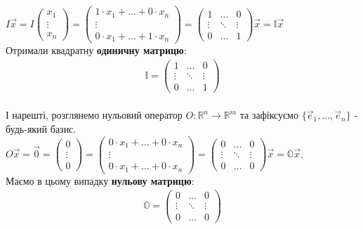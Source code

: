 \documentclass[a4paper, 10pt]{article}
\theoremstyle{theoremdd}
\begin{document}
	$I \vec{x} = I \begin{pmatrix}
	x_1 \\ \vdots \\ x_n
	\end{pmatrix} = \begin{pmatrix}
	1 \cdot x_1 + \dots + 0 \cdot x_n \\ \vdots \\ 0 \cdot x_1 + \dots + 1 \cdot x_n
	\end{pmatrix} = \begin{pmatrix}
	1 & \dots & 0 \\
	\vdots & \ddots & \vdots \\
	0 & \dots & 1
	\end{pmatrix} \vec{x} = \mathbb{I} \vec{x}$
	\\
	Отримали квадратну \textbf{одиничну матрицю}:
	\begin{align*}
	\mathbb{I} = \begin{pmatrix}
	1 & \dots & 0 \\
	\vdots & \ddots & \vdots \\
	0 & \dots & 1
	\end{pmatrix}
	\end{align*}
	\bigskip \\
	І нарешті, розглянемо нульовий оператор $O \colon \mathbb{R}^n \to \mathbb{R}^m$ та зафіксуємо $\{\vec{e}_1, \dots, \vec{e}_n\}$ - будь-який базис.\\
	$O \vec{x} = \vec{0} = \begin{pmatrix}
	0 \\ \vdots \\ 0
	\end{pmatrix} = \begin{pmatrix}
	0 \cdot x_1 + \dots + 0 \cdot x_n \\ \vdots \\ 0 \cdot x_1 + \dots + 0 \cdot x_n 
	\end{pmatrix} = \begin{pmatrix}
	0 & \dots & 0 \\
	\vdots & \ddots & \vdots \\
	0 & \dots & 0
	\end{pmatrix} \vec{x} = \mathbb{O} \vec{x}$.\\
	Маємо в цьому випадку \textbf{нульову матрицю}:
	\begin{align*}
	\mathbb{O} = \begin{pmatrix}
	0 & \dots & 0 \\
	\vdots & \ddots & \vdots \\
	0 & \dots & 0
	\end{pmatrix}
	\end{align*}
\end{document}
